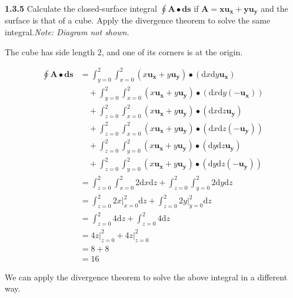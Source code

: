 \documentclass{article}
\begin{document}
\textbf{1.3.5} Calculate the closed-surface integral $\oint \mathbf{A} \bullet \mathbf{ds}$ if $\mathbf{A =
		x\mathbf{u_x} + y\mathbf{u_y}}$ and the surface is that of a cube. Apply the divergence theorem to solve the same
integral.\@ \textit{Note: Diagram not shown.}

\vspace{24pt}

The cube has side length $2$, and one of its corners is at the origin.

\begin{equation*}
	\begin{split}
		\oint \mathbf{A} \bullet \mathbf{ds} & = \int_{y=0}^2 \int_{x=0}^2 (x\mathbf{u_x} + y\mathbf{u_y}) \bullet (\text{d}x\text{d}y\mathbf{u_x}) \\
		& \quad + \int_{y=0}^2 \int_{x=0}^2 (x\mathbf{u_x} + y\mathbf{u_y}) \bullet (\text{d}x\text{d}y(-\mathbf{u_x})) \\
		& \quad + \int_{z=0}^2 \int_{x=0}^2 (x\mathbf{u_x} + y\mathbf{u_y}) \bullet (\text{d}x\text{d}z\mathbf{u_y}) \\
		& \quad + \int_{z=0}^2 \int_{x=0}^2 (x\mathbf{u_x} + y\mathbf{u_y}) \bullet (\text{d}x\text{d}z(-\mathbf{u_y})) \\
		& \quad + \int_{z=0}^2 \int_{y=0}^2 (x\mathbf{u_x} + y\mathbf{u_y}) \bullet (\text{d}y\text{d}z\mathbf{u_y}) \\
		& \quad + \int_{z=0}^2 \int_{y=0}^2 (x\mathbf{u_x} + y\mathbf{u_y}) \bullet (\text{d}y\text{d}z(-\mathbf{u_y})) \\
		& = \int_{z=0}^2 \int_{x=0}^2 2\text{d}x\text{d}z + \int_{z=0}^2 \int_{y=0}^2 2\text{d}y\text{d}z \\
		& = \int_{z=0}^2 2x\rvert_{x=0}^2\text{d}z + \int_{z=0}^2 2y\rvert_{y=0}^2\text{d}z \\
		& = \int_{z=0}^2 4\text{d}z + \int_{z=0}^2 4\text{d}z \\
		& = 4z\rvert_{z=0}^2 + 4z\rvert_{z=0}^2 \\
		& = 8 + 8 \\
		& = 16
	\end{split}
\end{equation*}

\newpage

We can apply the divergence theorem to solve the above integral in a different way.
\end{document}
